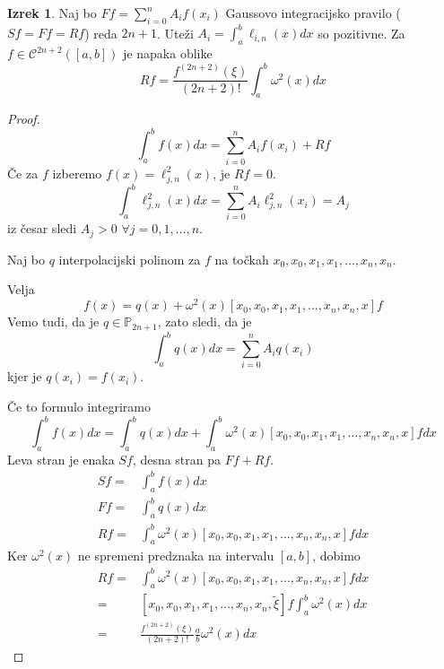 \documentclass[a4paper,12pt]{article}
\theoremstyle{definition}
\newtheorem{theorem}[counter]{Izrek}
\theoremstyle{remark}
\newcommand{\Pp}{\mathbb{P}}
\begin{document}
\begin{theorem}
    Naj bo $F f = \sum_{i=0}^{n} A_i f(x_i)$ Gaussovo integracijsko pravilo ($Sf = Ff = Rf$) reda $2n+1$. Uteži $A_i = \int_{a}^{b} \ell_{i, n}(x) dx$
    so pozitivne. Za $f \in \mathscr{C}^{2n+2}([a, b])$ je napaka oblike
    \begin{equation*}
        Rf = \frac{f^{(2n+2)}(\xi)}{(2n+2)!} \int_{a}^{b} \omega^2 (x) dx
    \end{equation*}
\end{theorem}
\begin{proof}
    \begin{equation*}
        \int_{a}^{b} f(x) dx = \sum_{i=0}^{n} A_i f(x_i) + Rf
    \end{equation*}
    Če za $f$ izberemo $f(x) = \ell_{j, n}^2 (x)$, je $Rf = 0$.
    \begin{equation*}
        \int_{a}^{b} \ell_{j, n}^2 (x) dx = \sum_{i = 0}^{n} A_i \ell_{j, n}^2 (x_i) = A_j
    \end{equation*}
    iz česar sledi $A_j > 0$ $\forall j = 0, 1, \dots, n$.

    Naj bo $q$ interpolacijski polinom za $f$ na točkah $x_0, x_0, x_1, x_1, \dots, x_n, x_n$.
    
    Velja
    \begin{equation*}
        f(x) = q(x) + \omega^2(x) [x_0, x_0, x_1, x_1, \dots, x_n, x_n, x] f
    \end{equation*}
    Vemo tudi, da je $q \in \Pp_{2n+1}$, zato sledi, da je
    \begin{equation*}
        \int_{a}^{b} q(x) dx = \sum_{i=0}^{n} A_i q(x_i)
    \end{equation*}
    kjer je $q(x_i) = f(x_i)$.

    Če to formulo integriramo
    \begin{equation*}
        \int_{a}^{b} f(x) dx = \int_{a}^{b} q(x) dx +  \int_{a}^{b} \omega^2(x) [x_0, x_0, x_1, x_1, \dots, x_n, x_n, x] f dx
    \end{equation*}
    Leva stran je enaka $Sf$, desna stran pa $Ff + Rf$.
    \begin{align*}
        Sf =& \int_{a}^{b} f(x) dx\\
        Ff =& \int_{a}^{b} q(x) dx\\
        Rf =& \int_{a}^{b} \omega^2(x) [x_0, x_0, x_1, x_1, \dots, x_n, x_n, x] f dx
    \end{align*}
    Ker $\omega^2(x)$ ne spremeni predznaka na intervalu $[a, b]$, dobimo
    \begin{align*}
        Rf =& \int_{a}^{b} \omega^2(x) [x_0, x_0, x_1, x_1, \dots, x_n, x_n, x] f dx \\
           =& [x_0, x_0, x_1, x_1, \dots, x_n, x_n, \tilde{\xi}] f \int_{a}^{b} \omega^2(x) dx \\
           =& \frac{f^{(2n+2)} (\xi)}{(2n+2)!} \frac{a}{b} \omega^2(x) dx
    \end{align*}
\end{proof}
\end{document}
